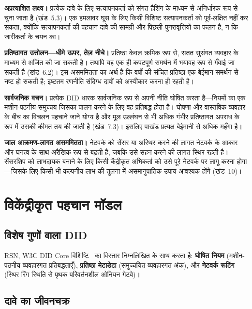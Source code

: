\documentclass[11pt,a4paper,twocolumn]{article}
\begin{document}
\textbf{अप्रत्याशित लक्ष्य।} प्रत्येक दावे के लिए सत्यापनकर्ता को संगत हैशिंग के माध्यम से अनिर्धारक रूप से चुना जाता है (खंड~5.3)। एक हमलावर घूस के लिए किसी विशिष्ट सत्यापनकर्ता को पूर्व-लक्षित नहीं कर सकता, क्योंकि सत्यापनकर्ता की पहचान दावे की सामग्री और पिछली पुनरावृत्तियों का फलन है, न कि जारीकर्ता के चयन का।

\textbf{प्रतिष्ठागत उत्तोलन---धीमे ऊपर, तेज़ नीचे।} प्रतिष्ठा केवल क्रमिक रूप से, सतत सुसंगत व्यवहार के माध्यम से अर्जित की जा सकती है। तथापि यह एक ही कपटपूर्ण समर्थन में भयावह रूप से गँवाई जा सकती है (खंड~6.2)। इस असममितता का अर्थ है कि वर्षों की संचित प्रतिष्ठा एक बेईमान समर्थन से नष्ट हो सकती है; इष्टतम रणनीति संदिग्ध दावों को अस्वीकार करना ही रहती है।

\textbf{सार्वजनिक वचन।} प्रत्येक DID धारक सार्वजनिक रूप से अपनी नीति घोषित करता है---नियमों का एक मशीन-पठनीय समुच्चय जिसका पालन करने के लिए वह प्रतिबद्ध होता है। घोषणा और वास्तविक व्यवहार के बीच का विचलन पहचाने जाने योग्य है और मूल उल्लंघन से भी अधिक गंभीर प्रतिष्ठागत अपराध के रूप में उसकी कीमत तय की जाती है (खंड~7.3)। इसलिए पाखंड प्रत्यक्ष बेईमानी से अधिक महँगा है।

\textbf{जाल आक्रमण-लागत असममितता।} नेटवर्क को सेंसर या अस्थिर करने की लागत नेटवर्क के आकार और घनत्व के साथ अरैखिक रूप से बढ़ती है, जबकि उसे सहन करने की लागत स्थिर रहती है। सेंसरशिप को लाभदायक बनाने के लिए किसी केंद्रीकृत अभिकर्ता को उसे पूरे नेटवर्क पर लागू करना होगा---जिसके लिए किसी भी कल्पनीय लाभ की तुलना में असमानुपातिक उपाय आवश्यक होंगे (खंड~10)।

\section{विकेंद्रीकृत पहचान मॉडल}

\subsection{विशेष गुणों वाला DID}

RSN, W3C DID Core विशिष्टि~\cite{did2022} का विस्तार निम्नलिखित के साथ करता है: \textbf{घोषित नियम} (मशीन-पठनीय व्यवहारगत प्रतिबद्धताएँ), \textbf{प्रतिष्ठा मेटाडेटा} (समुच्चयित व्यवहारगत अंक), और \textbf{नेटवर्क रूटिंग} (स्थिर रिंग स्थिति से पृथक परिवर्तनशील ओनियन गेटवे)।

\subsection{दावे का जीवनचक्र}
\end{document}
